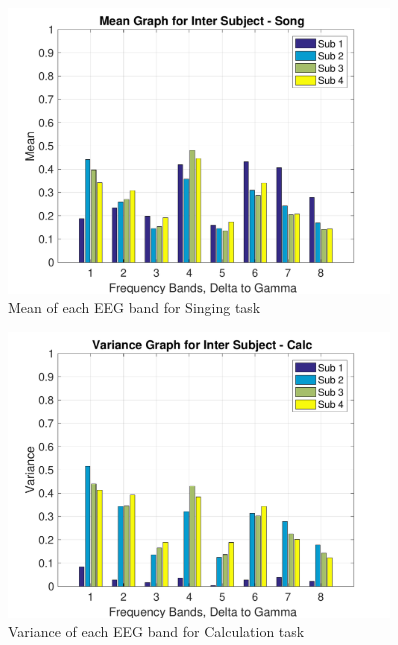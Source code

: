     \begin{figure}[hbtp]
    	\centering
    	\includegraphics[width=0.9\textwidth]{Chapter-4/5}
    	\caption{Mean of each EEG band for Singing task}
    	\label{fig:chap45}
    \end{figure}

    \begin{figure}[hbtp]
    	\centering
    	\includegraphics[width=0.9\textwidth]{Chapter-4/2}
    	\caption{Variance of each EEG band for Calculation task}
    	\label{fig:chap42}
    \end{figure}

